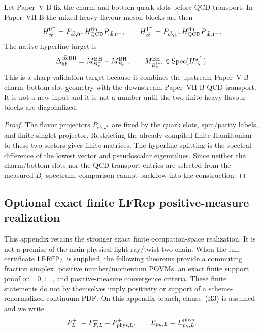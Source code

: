 \documentclass[12pt,a4paper]{article}
\begin{document}
\begin{proposition}
\label{p11:prop:mixed-cb-hyperfine-validation-target}
Let Paper~V-B fix the charm and bottom quark slots before QCD transport.  In Paper~VII-B the mixed heavy-flavour meson blocks are then
\begin{equation}
\label{p11:eq:bc-blocks-native-spectral-target}
H_{c\bar b}^{0^-}=P_{c\bar b,0^-}H_{\rm QCD}^{\rm fin}P_{c\bar b,0^-},
\qquad
H_{c\bar b}^{1^-}=P_{c\bar b,1^-}H_{\rm QCD}^{\rm fin}P_{c\bar b,1^-}.
\end{equation}
The native hyperfine target is
\begin{equation}
\label{p11:eq:bc-hyperfine-native-target}
\Delta_{\rm hf}^{c\bar b,\rm BH}
=
M_{B_c^\ast}^{\rm BH}-M_{B_c}^{\rm BH},
\qquad
M_{B_c^{(\ast)}}^{\rm BH}\in\operatorname{Spec}(H_{c\bar b}^{J^P}).
\end{equation}
This is a sharp validation target because it combines the upstream Paper~V-B charm--bottom slot geometry with the downstream Paper~VII-B QCD transport.  It is not a new input and it is not a number until the two finite heavy-flavour blocks are diagonalized.
\end{proposition}
\begin{proof}
The flavor projectors \(P_{c\bar b,J^P}\) are fixed by the quark slots, spin/parity labels, and finite singlet projector.  Restricting the already compiled finite Hamiltonian to these two sectors gives finite matrices.  The hyperfine splitting is the spectral difference of the lowest vector and pseudoscalar eigenvalues.  Since neither the charm/bottom slots nor the QCD transport entries are selected from the measured \(B_c\) spectrum, comparison cannot backflow into the construction.
\end{proof}





\subsection{Optional exact finite LFRep positive-measure realization}
\label{p11:app:v264-exact-lfrep-positive-measures}
This appendix retains the stronger exact finite occupation-space realization.
It is not a premise of the main physical light-ray/twist-two chain.  When the
full certificate \(\mathsf{LF\!\mbox{-}REP}_L\) is supplied, the following theorems provide a
commuting fraction simplex, positive number/momentum POVMs, an exact finite
support proof on \([0,1]\), and positive-measure convergence criteria.  These
finite statements do not by themselves imply positivity or support of a
scheme-renormalized continuum PDF.  On this appendix branch, clause~\textnormal{(R3)} is assumed and we write
\[
 P_L^+:=P_{F,L}^+=P_{\rm phys,L}^+,
 \qquad E_{p_h,L}=E^{\rm phys}_{p_h,L}.
\]
\end{document}
